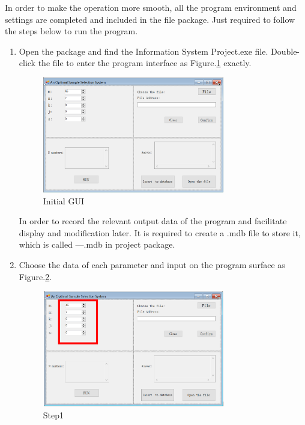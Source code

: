 In order to make the operation more smooth, all the program environment and settings are completed and included in the file package. Just required to follow the steps below to run the program.
\begin{enumerate}
\item Open the package and find the Information System Project.exe file. Double-click the file to enter the program interface as Figure.\ref{fig:init} exactly.
\begin{figure}[!htbp]
	\centering
	\includegraphics[width=0.75\textwidth]{images/initial.png}
	\caption{Initial GUI}
	\label{fig:init}
\end{figure}

In order to record the relevant output data of the program and facilitate display and modification later. It is required to create a .mdb file to store it, which is called ---.mdb in project package.

\item Choose the data of each parameter and input on the program surface as Figure.\ref{fig:st1}.
\begin{figure}[!htbp]
	\centering
	\includegraphics[width=0.75\textwidth]{images/step1.png}
	\caption{Step1}
	\label{fig:st1}
\end{figure}


\end{enumerate}
